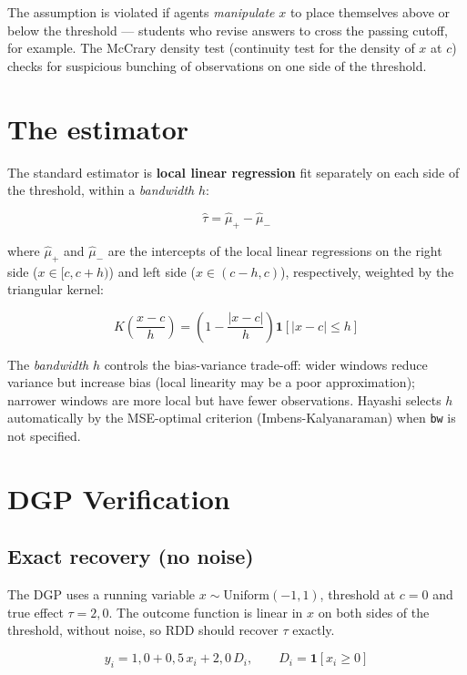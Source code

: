 The assumption is violated if agents \emph{manipulate} $x$ to place themselves above or
below the threshold --- students who revise answers to cross the passing cutoff,
for example. The McCrary density test (continuity test for the density of $x$ at $c$)
checks for suspicious bunching of observations on one side of the threshold.

\section{The estimator}

The standard estimator is \textbf{local linear regression} fit separately on each
side of the threshold, within a \emph{bandwidth} $h$:

\[
  \hat\tau = \hat\mu_+ - \hat\mu_-
\]

where $\hat\mu_+$ and $\hat\mu_-$ are the intercepts of the local linear
regressions on the right side ($x \in [c, c+h)$) and left side ($x \in (c-h, c)$),
respectively, weighted by the triangular kernel:

\[
  K\!\left(\frac{x - c}{h}\right) = \left(1 - \frac{|x-c|}{h}\right)
  \mathbf{1}[|x-c| \leq h]
\]

The \emph{bandwidth} $h$ controls the bias-variance trade-off: wider windows reduce
variance but increase bias (local linearity may be a poor approximation);
narrower windows are more local but have fewer observations. Hayashi
selects $h$ automatically by the MSE-optimal criterion (Imbens-Kalyanaraman)
when \lstinline{bw} is not specified.

\section{DGP Verification}

\subsection*{Exact recovery (no noise)}

The DGP uses a running variable $x \sim \mathrm{Uniform}(-1, 1)$, threshold at
$c = 0$ and true effect $\tau = 2{,}0$. The outcome function is linear
in $x$ on both sides of the threshold, without noise, so RDD should recover
$\tau$ exactly.

\[
  y_i = 1{,}0 + 0{,}5\,x_i + 2{,}0\,D_i, \qquad D_i = \mathbf{1}[x_i \geq 0]
\]

